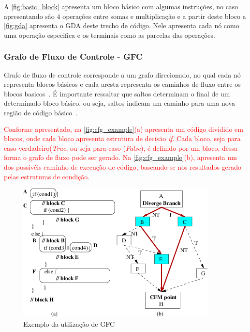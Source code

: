 A \autoref{fig:basic_block} apresenta um bloco básico com algumas instruções, no caso apresentando são $4$ operações entre somas e multiplicação e a partir deste bloco a \autoref{fig:gda} apresenta o GDA deste trecho de código. Nele apresenta cada nó como uma operação especifica e os terminais como as parcelas das operações.

\subsubsection{Grafo de Fluxo de Controle - GFC}

Grafo de fluxo de controle corresponde a um grafo direcionado, no qual cada nó representa blocos básicos e cada aresta representa os caminhos de fluxo entre os blocos basicos~\cite{allen1970control}. É importante ressaltar que saltos determinam o final de um determinado bloco básico, ou seja, saltos indicam um caminho para uma nova região de código básico~\cite{aho2007compilers}.

\par
\textcolor{red}{Conforme apresentado, na \autoref{fig:cfg_example}(a) apresenta um código dividido em blocos, onde cada bloco apresenta estrutura de decisão \textit{if}. Cada bloco, seja para caso verdadeiro(\textit{True}, ou seja para caso (\textit{False}), é definido por um bloco, dessa forma o grafo de fluxo pode ser gerado. Na \autoref{fig:cfg_example}(b), apresenta um dos possivéis caminho de execução de código, baseando-se nos resultados gerado pelas estruturas de condição.}

\begin{figure}[H]
	\begin{center}
    \caption{\label{fig:cfg_example}Exemplo da utilização de GFC}
	\includegraphics[scale=0.9]{Figuras/cfg_example(a)(b).png}
	\end{center}
\end{figure}

